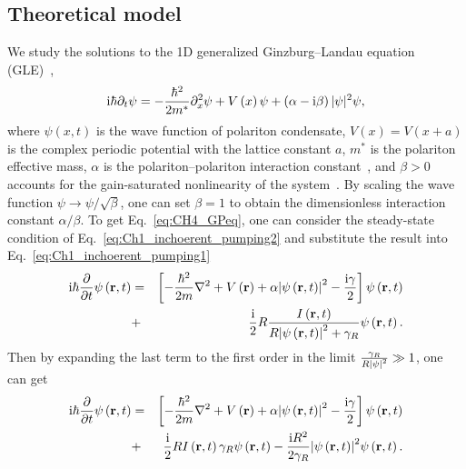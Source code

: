 
%
%
\subsection{Theoretical model}
We study the solutions to the 1D generalized Ginzburg--Landau equation (GLE)~\cite{Keeling:2008js},
\begin{equation}\label{eq:CH4_GPeq}
    \mathrm{i}\hbar\partial_t\psi =
    -\frac{\hbar^2}{2 m^*}\partial^2_x\psi + V\left(x\right)\psi
    +\left(\alpha-\mathrm{i}\beta\right)|\psi|^2\psi,
\end{equation}
where $\psi\left(x,t\right)$ is the wave function of polariton condensate, $V(x)=V(x+a)$ is the complex periodic potential with the lattice constant $a$, $m^*$ is the polariton effective mass, $\alpha$ is the polariton--polariton interaction constant~\cite{Ciuti:1998aa,Tassone:1999aa,Magnusson:2011aa}, and $\beta>0$ accounts for the gain-saturated nonlinearity of the system~\cite{Keeling:2008js, Karpov:2015aa}.
By scaling the wave function $\psi\rightarrow\psi/\sqrt{\beta}$, one can set $\beta=1$ to obtain the dimensionless interaction constant $\alpha/\beta$.
To get Eq.~\eqref{eq:CH4_GPeq}, one can consider the steady-state condition of Eq.~\eqref{eq:Ch1_inchoerent_pumping2} and substitute the result into Eq.~\eqref{eq:Ch1_inchoerent_pumping1}
\begin{eqnarray}
    \label{eq:CH4_GPEQ1}
\mathrm{i}\hbar \frac{\partial}{\partial t} \psi\left(\mathbf{r},t\right) &=& \left[ -\frac{\hbar^2}{2m}\nabla^2 + V\left(\mathbf{r}\right) + \alpha \abs{\psi\left(\mathbf{r},t\right)}^2 -\frac{\mathrm{i} \gamma}{2} \right] \psi\left(\mathbf{r},t\right)\nonumber
    \\ &+& \frac{\mathrm{i}}{2}R\frac{I\left(\mathbf{r},t\right)}{R \abs{\psi\left(\mathbf{r},t\right)}^2 + \gamma_R} \psi\left(\mathbf{r},t\right).
\end{eqnarray}
Then by expanding the last term to the first order in the limit $\frac{\gamma_R}{R\abs{\psi}^2}\gg 1$, one can get
\begin{eqnarray}
    \label{eq:CH4_GPEQ2}
\mathrm{i}\hbar \frac{\partial}{\partial t} \psi\left(\mathbf{r},t\right) &=& \left[ -\frac{\hbar^2}{2m}\nabla^2 + V\left(\mathbf{r}\right) + \alpha \abs{\psi\left(\mathbf{r},t\right)}^2 -\frac{\mathrm{i} \gamma}{2} \right] \psi\left(\mathbf{r},t\right)\nonumber
    \\ &+& \frac{\mathrm{i}}{2}R I\left(\mathbf{r},t\right)\gamma_R\psi\left(\mathbf{r},t\right) -\frac{\mathrm{i} R^2}{2\gamma_R}\abs{\psi\left(\mathbf{r},t\right)}^2\psi\left(\mathbf{r},t\right).
\end{eqnarray}
